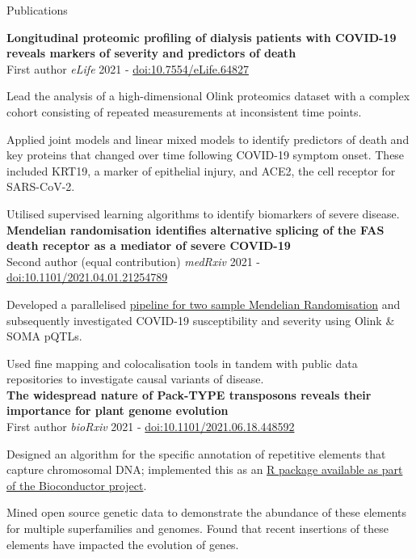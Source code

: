 \documentclass{resume}
\begin{document}
\begin{rSection}{Publications}

\vspace{1pt plus 1pt}
\textbf{Longitudinal proteomic profiling of dialysis patients with COVID-19 reveals markers of severity and predictors of death} \\
First author \hfill  \textit{eLife} 2021 - \href{https://doi.org/10.7554/eLife.64827}{doi:10.7554/eLife.64827}

\vspace{2pt plus 1pt}
\item Lead the analysis of a high-dimensional Olink proteomics dataset with a complex cohort consisting of repeated measurements at inconsistent time points.
\item Applied joint models and linear mixed models to identify predictors of death and key proteins that changed over time following COVID-19 symptom onset. These included KRT19, a marker of epithelial injury, and ACE2, the cell receptor for SARS-CoV-2.
\item Utilised supervised learning algorithms to identify biomarkers of severe disease. \\

\textbf{Mendelian randomisation identifies alternative splicing of the FAS death receptor as a mediator of severe COVID-19} \\
Second author (equal contribution) \hfill  \textit{medRxiv} 2021 - \href{https://doi.org/10.1101/2021.04.01.21254789}{doi:10.1101/2021.04.01.21254789}

\vspace{2pt plus 1pt minus 1pt}
\item Developed a parallelised \href{https://github.com/jackgisby/mr-nextflow}{pipeline for two sample Mendelian Randomisation} and subsequently investigated COVID-19 susceptibility and severity using Olink \& SOMA pQTLs. 
\item Used fine mapping and colocalisation tools in tandem with public data repositories to investigate causal variants of disease. \\

\textbf{The widespread nature of Pack-TYPE transposons reveals their importance for plant genome evolution} \\
First author \hfill  \textit{bioRxiv} 2021 - \href{https://doi.org/10.1101/2021.06.18.448592}{doi:10.1101/2021.06.18.448592}

\vspace{2pt plus 1pt minus 1pt}
\item Designed an algorithm for the specific annotation of repetitive elements that capture chromosomal DNA; implemented this as an \href{https://bioconductor.org/packages/release/bioc/html/packFinder.html}{R package available as part of the Bioconductor project}.
\item Mined open source genetic data to demonstrate the abundance of these elements for multiple superfamilies and genomes. Found that recent insertions of these elements have impacted the evolution of genes. \\


\end{rSection}
\end{document}
